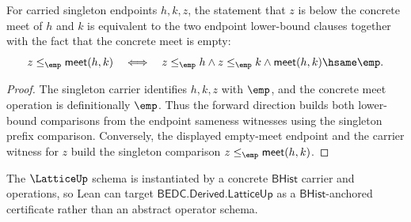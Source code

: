 \begin{theorem}
\label{thm:lattice-singleton-meet-glb-empty-exactness}
For carried singleton endpoints $h,k,z$, the statement that $z$ is below the
concrete meet of $h$ and $k$ is equivalent to the two endpoint lower-bound
clauses together with the fact that the concrete meet is empty:
$$
z\le_{\emp}\mathsf{meet}(h,k)
\quad\Longleftrightarrow\quad
z\le_{\emp}h\wedge z\le_{\emp}k\wedge \mathsf{meet}(h,k)\hsame\emp.
$$
\end{theorem}
\begin{proof}
The singleton carrier identifies $h,k,z$ with $\emp$, and the concrete meet
operation is definitionally $\emp$. Thus the forward direction builds both
lower-bound comparisons from the endpoint sameness witnesses using the
singleton prefix comparison. Conversely, the displayed empty-meet endpoint
and the carrier witness for $z$ build the singleton comparison
$z\le_{\emp}\mathsf{meet}(h,k)$.
\end{proof}

The $\LatticeUp$ schema is instantiated by a concrete $\mathsf{BHist}$ carrier
and operations, so Lean can target $\mathsf{BEDC.Derived.LatticeUp}$ as a
$\mathsf{BHist}$-anchored certificate rather than an abstract operator schema.
